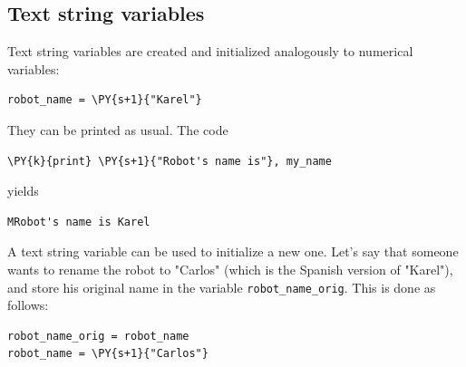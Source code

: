 \noindent

\subsection[\ \ Text string variables]{Text string variables}

Text string variables are created and initialized analogously 
to numerical variables:\\

\begin{bbox}
\begin{Verbatim}[commandchars=\\\{\}]
robot_name = \PY{s+1}{"Karel"}
\end{Verbatim}
\end{bbox}
\vspace{6mm}
 
\noindent
They can be printed as usual. The code\\

\begin{bbox}
\begin{Verbatim}[commandchars=\\\{\}]
\PY{k}{print} \PY{s+1}{"Robot's name is"}, my_name
\end{Verbatim}
\end{bbox}
\vspace{6mm}

\noindent
yields\\

\begin{ybox}
\begin{Verbatim}[commandchars=\\\{\}]
MRobot's name is Karel
\end{Verbatim}
\end{ybox}
\vspace{6mm}

\noindent
A text string variable can be used to initialize a new one. Let's say 
that someone wants to rename the robot to "Carlos" (which is the Spanish 
version of "Karel"),
and store his original name in the variable {\tt robot\_name\_orig}. 
This is done as follows:\\

\begin{bbox}
\begin{Verbatim}[commandchars=\\\{\}]
robot_name_orig = robot_name
robot_name = \PY{s+1}{"Carlos"}
\end{Verbatim}
\end{bbox}
\vspace{6mm}


